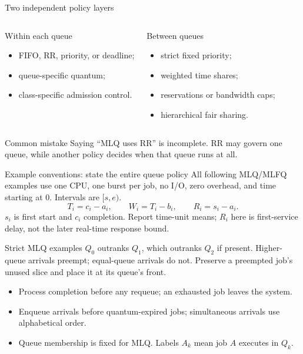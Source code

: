 \documentclass[aspectratio=169,11pt]{beamer}
\begin{document}
\begin{frame}{Two independent policy layers}
  \begin{columns}[T,onlytextwidth]
      \begin{block}{Within each queue}
        \begin{itemize}
          \item FIFO, RR, priority, or deadline;
          \item queue-specific quantum;
          \item class-specific admission control.
        \end{itemize}
      \end{block}
      \begin{block}{Between queues}
        \begin{itemize}
          \item strict fixed priority;
          \item weighted time shares;
          \item reservations or bandwidth caps;
          \item hierarchical fair sharing.
        \end{itemize}
      \end{block}
  \end{columns}
  \begin{alertblock}{Common mistake}
    Saying ``MLQ uses RR'' is incomplete. RR may govern one queue, while another policy decides when that queue runs at all.
  \end{alertblock}
\end{frame}

\begin{frame}{Example conventions: state the entire queue policy}
  \small All following MLQ/MLFQ examples use one CPU, one burst per job, no I/O, zero overhead, and time starting at 0. Intervals are $[s,e)$.
  \[
    T_i=c_i-a_i,\qquad W_i=T_i-b_i,\qquad R_i=s_i-a_i.
  \]
  $s_i$ is first start and $c_i$ completion. Report time-unit means; $R_i$ here is first-service delay, not the later real-time response bound.
  \begin{block}{Strict MLQ examples}
    $Q_0$ outranks $Q_1$, which outranks $Q_2$ if present. Higher-queue arrivals preempt; equal-queue arrivals do not. Preserve a preempted job's unused slice and place it at its queue's front.
  \end{block}
  \begin{itemize}
    \item Process completion before any requeue; an exhausted job leaves the system.
    \item Enqueue arrivals before quantum-expired jobs; simultaneous arrivals use alphabetical order.
    \item Queue membership is fixed for MLQ. Labels $A_k$ mean job $A$ executes in $Q_k$.
  \end{itemize}
\end{frame}
\end{document}
